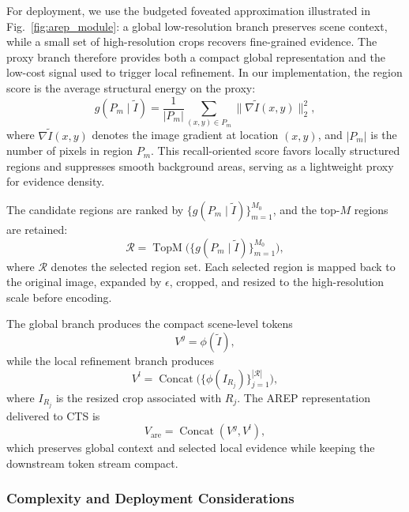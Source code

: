 \documentclass[journal,twoside,web]{ieeecolor}
\newcommand{\figref}[1]{Fig.~\ref{#1}}
\begin{document}
For deployment, we use the budgeted foveated approximation illustrated in \figref{fig:arep_module}: a global low-resolution branch preserves scene context, while a small set of high-resolution crops recovers fine-grained evidence.
The proxy branch therefore provides both a compact global representation and the low-cost signal used to trigger local refinement.
In our implementation, the region score is the average structural energy on the proxy:
\begin{equation}
  g(P_m \mid \tilde I)
  =
  \frac{1}{|P_m|}
  \sum_{(x,y)\in P_m}
  \|\nabla \tilde I(x,y)\|_2^2,
  \label{eq:gm}
\end{equation}
where $\nabla \tilde I(x,y)$ denotes the image gradient at location $(x,y)$, and $|P_m|$ is the number of pixels in region $P_m$.
This recall-oriented score favors locally structured regions and suppresses smooth background areas, serving as a lightweight proxy for evidence density.

The candidate regions are ranked by $\{g(P_m\mid \tilde I)\}_{m=1}^{M_0}$, and the top-$M$ regions are retained:
\begin{equation}
  \mathcal{R}=\operatorname{TopM}\Big(\{g(P_m\mid \tilde I)\}_{m=1}^{M_0}\Big),
  \label{eq:topm}
\end{equation}
where $\mathcal{R}$ denotes the selected region set.
Each selected region is mapped back to the original image, expanded by $\epsilon$, cropped, and resized to the high-resolution scale before encoding.

The global branch produces the compact scene-level tokens
\begin{equation}
  V^{g}=\phi(\tilde I),
  \label{eq:vg}
\end{equation}
while the local refinement branch produces
\begin{equation}
  V^{l}=\operatorname{Concat}\big(\{\phi(I_{R_j})\}_{j=1}^{|\mathcal{R}|}\big),
  \label{eq:vl}
\end{equation}
where $I_{R_j}$ is the resized crop associated with $R_j$.
The AREP representation delivered to CTS is
\begin{equation}
  V_{\mathrm{are}}=\operatorname{Concat}(V^{g},V^{l}),
  \label{eq:vare_final}
\end{equation}
which preserves global context and selected local evidence while keeping the downstream token stream compact.

\subsubsection{Complexity and Deployment Considerations}
\label{sec:arep_complexity}
\end{document}
